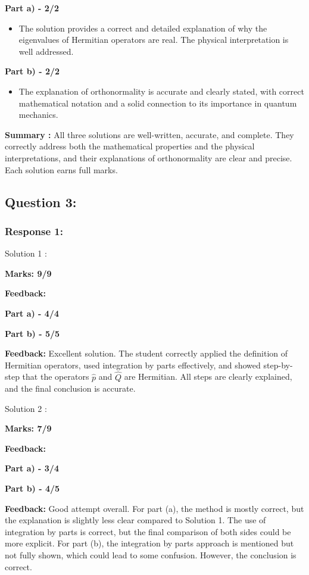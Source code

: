 \documentclass[a4paper,11pt]{article}
\begin{document}
\textbf{Part a) - 2/2}

\begin{itemize}
    \item The solution provides a correct and detailed explanation of why the eigenvalues of Hermitian operators are real. The physical interpretation is well addressed.
\end{itemize}

\textbf{Part b) - 2/2}

\begin{itemize}
    \item The explanation of orthonormality is accurate and clearly stated, with correct mathematical notation and a solid connection to its importance in quantum mechanics.
\end{itemize}


\textbf{Summary :}
All three solutions are well-written, accurate, and complete. They correctly address both the mathematical properties and the physical interpretations, and their explanations of orthonormality are clear and precise. Each solution earns full marks.


\subsection*{Question 3:}

\subsubsection*{Response 1:}

Solution 1 :

\textbf{Marks: 9/9}

\textbf{Feedback:}

\textbf{Part a) - 4/4}

\textbf{Part b) - 5/5}


\textbf{Feedback:}
Excellent solution. The student correctly applied the definition of Hermitian operators, used integration by parts effectively, and showed step-by-step that the operators $\hat{p}$ and $\hat{Q}$ are Hermitian. All steps are clearly explained, and the final conclusion is accurate.


Solution 2 :

\textbf{Marks: 7/9}

\textbf{Feedback:}

\textbf{Part a) - 3/4}


\textbf{Part b) - 4/5}


\textbf{Feedback:}
Good attempt overall. For part (a), the method is mostly correct, but the explanation is slightly less clear compared to Solution 1. The use of integration by parts is correct, but the final comparison of both sides could be more explicit. For part (b), the integration by parts approach is mentioned but not fully shown, which could lead to some confusion. However, the conclusion is correct.
\end{document}
